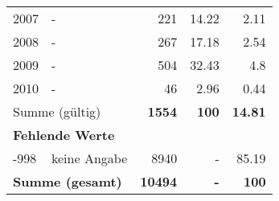 \begin{longtable}{lXrrr}
     2007 &
     \multicolumn{1}{X}{ -  } &


       \num{221} &
       \num[round-mode=places,round-precision=2]{14,22} &
         \num[round-mode=places,round-precision=2]{2,11} \\

     2008 &
     \multicolumn{1}{X}{ -  } &


       \num{267} &
       \num[round-mode=places,round-precision=2]{17,18} &
         \num[round-mode=places,round-precision=2]{2,54} \\

     2009 &
     \multicolumn{1}{X}{ -  } &


       \num{504} &
       \num[round-mode=places,round-precision=2]{32,43} &
         \num[round-mode=places,round-precision=2]{4,8} \\

     2010 &
     \multicolumn{1}{X}{ -  } &


       \num{46} &
       \num[round-mode=places,round-precision=2]{2,96} &
         \num[round-mode=places,round-precision=2]{0,44} \\
     \midrule
     \multicolumn{2}{l}{Summe (gültig)} &
       \textbf{\num{1554}} &
     \textbf{100} &
       \textbf{\num[round-mode=places,round-precision=2]{14,81}} \\
     \multicolumn{5}{l}{\textbf{Fehlende Werte}}\\
       -998 &
       keine Angabe &
         \num{8940} &
        - &
         \num[round-mode=places,round-precision=2]{85,19} \\
     \midrule
     \multicolumn{2}{l}{\textbf{Summe (gesamt)}} &
          \textbf{\num{10494}} &
        \textbf{-} &
        \textbf{100} \\
     \bottomrule
     \end{longtable}
     
